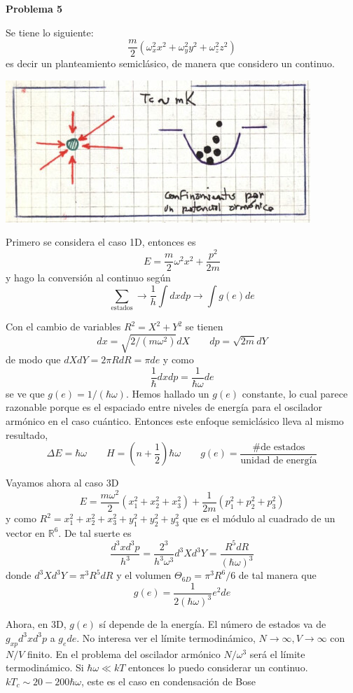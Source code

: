\documentclass[10pt,oneside]{CBFT_book}
\begin{document}
\begin{ejemplo}{\bf Problema 5}

Se tiene lo siguiente:
\[
	\frac{m}{2}( \omega_x^2 x^2 + \omega_y^2 y^2 + \omega_z^2 z^2 )
\]
es decir un planteamiento semiclásico, de manera que considero un continuo.

\includegraphics[scale=0.3]{images/1606329642.jpg}

Primero se considera el caso 1D, entonces es
\[
	E = \frac{m}{2} \omega^2 x^2 + \frac{ p^2 }{2m}
\]
y hago la conversión al continuo según
\[
	\sum_\text{estados} \longrightarrow \frac{1}{h} \int dx dp \longrightarrow \int g(e) de
\]

Con el cambio de variables $ R^2 = X^2 + Y^2 $ se tienen
\[
	dx = \sqrt{2/(m\omega^2)} dX \qquad dp = \sqrt{2m} dY
\]
de modo que $ dX dY = 2 \pi R dR = \pi de $ y como 
\[
	\frac{1}{\hbar} dx dp = \frac{1}{\hbar\omega} de
\]
se ve que $ g(e) = 1 / (\hbar \omega )$. Hemos hallado un $g(e)$ constante, lo cual parece razonable 
porque es el espaciado entre niveles de energía para el oscilador armónico en el caso cuántico.
Entonces este enfoque semiclásico lleva al mismo resultado,
\[
	\Delta E = \hbar \omega \qquad H = \left( n + \frac{1}{2} \right) \hbar \omega \qquad 
	g(e) = \frac{\text{\# de estados}}{\text{unidad de energía}}
\]

Vayamos ahora al caso 3D
\[
	E = \frac{m \omega^2 }{ 2 }( x_1^2 + x_2^2 + x_3^2 ) + \frac{1}{2m} ( p_1^2 + p_2^2 + p_3^2 )
\]
y como $ R^2 = x_1^2 + x_2^2 + x_3^2 + y_1^2 + y_2^2 + y_3^2 $ que es el módulo al cuadrado de un
vector en $\mathbb{R}^6$. De tal suerte es
\[
	\frac{ d^3x d^3p }{ h^3 } = \frac{ 2^3 }{ h^3 \omega^3 } d^3X d^3Y = \frac{ R^5 dR }{ (\hbar \omega)^3}
\]
donde $d^3X d^3Y = \pi^3 R^5 dR $ y el volumen $\Theta_{6D} = \pi^3 R^6/6$ de tal manera que
\[
	g(e) = \frac{1}{2(\hbar\omega)^3} e^2 de
\]

Ahora, en 3D, $g(e)$ sí depende de la energía. El número de estados va de $g_{xp} d^3x d^3p$ a $g_e de$.
No interesa ver el límite termodinámico, $N\to\infty, V\to\infty$ con $N/V$ finito.
En el problema del oscilador armónico $ N/\omega^3 $ será el límite termodinámico.
Si $\hbar \omega \ll k T$ entonces lo puedo considerar un continuo. $kT_c \sim 20-200 \hbar\omega$, este
es el caso en condensación de Bose


\end{ejemplo}
\end{document}
